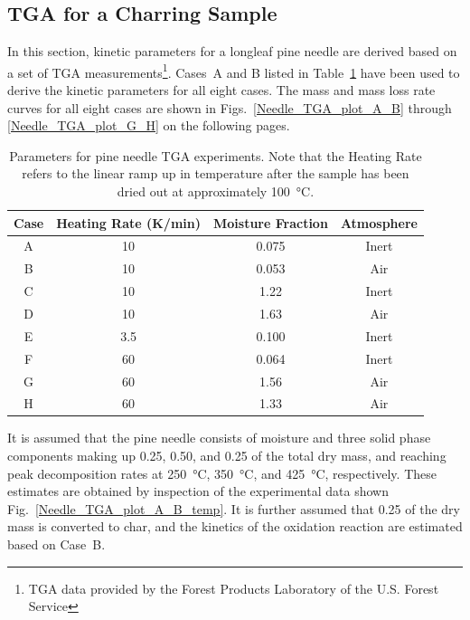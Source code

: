 \documentclass[11pt]{book}
\begin{document}
\subsection{TGA for a Charring Sample}
\label{Needle_TGA}

In this section, kinetic parameters for a longleaf pine needle are derived based on a set of TGA measurements\footnote{TGA data provided by the Forest Products Laboratory of the U.S. Forest Service}. Cases~A and B listed in Table~\ref{Needle_TGA_table} have been used to derive the kinetic parameters for all eight cases. The mass and mass loss rate curves for all eight cases are shown in Figs.~\ref{Needle_TGA_plot_A_B} through \ref{Needle_TGA_plot_G_H} on the following pages.

\begin{table}[!ht]
\centering
\caption[Parameters for pine needle TGA experiments]{Parameters for pine needle TGA experiments. Note that the Heating Rate refers to the linear ramp up in temperature after the sample has been dried out at approximately 100~\unit{\degreeCelsius}.}
\label{Needle_TGA_table}
\begin{tabular}{|c|c|c|c|}
\hline
Case & Heating Rate (K/min)  & Moisture Fraction & Atmosphere \\ \hline
A    & 10                    & 0.075             & Inert      \\
B    & 10                    & 0.053             & Air        \\
C    & 10                    & 1.22              & Inert      \\
D    & 10                    & 1.63              & Air        \\
E    & 3.5                   & 0.100             & Inert      \\
F    & 60                    & 0.064             & Inert      \\
G    & 60                    & 1.56              & Air        \\
H    & 60                    & 1.33              & Air        \\ \hline
\end{tabular}
\end{table}

It is assumed that the pine needle consists of moisture and three solid phase components making up 0.25, 0.50, and 0.25 of the total dry mass, and reaching peak decomposition rates at 250~\unit{\degreeCelsius}, 350~\unit{\degreeCelsius}, and 425~\unit{\degreeCelsius}, respectively. These estimates are obtained by inspection of the experimental data shown Fig.~\ref{Needle_TGA_plot_A_B_temp}. It is further assumed that 0.25 of the dry mass is converted to char, and the kinetics of the oxidation reaction are estimated based on Case~B.
\end{document}
